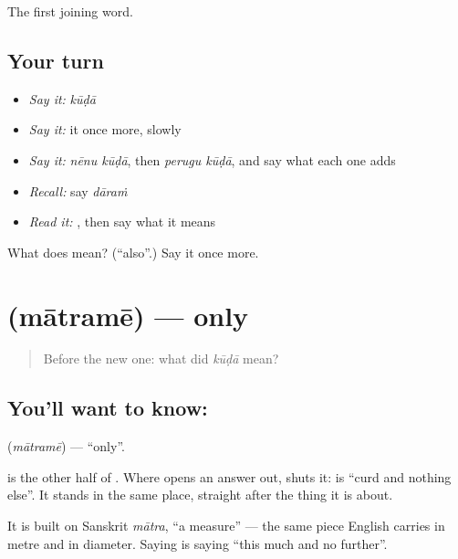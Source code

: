 \begin{grammarlens}[title={What you've built}]
The first joining word.
\end{grammarlens}

\subsection*{Your turn}
\begin{itemize}
\raggedright
  \item \emph{Say it:} \emph{kūḍā}
  \item \emph{Say it:} it once more, slowly
  \item \emph{Say it:} \emph{nēnu kūḍā}, then \emph{perugu kūḍā}, and say what each one adds
  \item \emph{Recall:} say \emph{dāraṁ}
  \item \emph{Read it:} \textbf{}, then say what it means
\end{itemize}

\begin{tcolorbox}[breakable,colback=teal!4,colframe=teal!35!black,title={Before you move on}]
What does  mean? (\textquotedblleft{}also\textquotedblright{}.) Say it once more.
\end{tcolorbox}
\section[\texorpdfstring{\te{మాత్రమే} (mātramē)}{మాత్రమే (mātramē)}]{ (mātramē) — only}

\label{lesson:TE-C64-only}



\begin{quote}
Before the new one: what did \emph{kūḍā} mean?
\end{quote}

\subsection*{You'll want to know: }
\textbf{} (\emph{mātramē}) — \textquotedblleft{}only\textquotedblright{}.

 is the other half of . Where  opens an answer out,  shuts it:   is \textquotedblleft{}curd and nothing else\textquotedblright{}. It stands in the same place, straight after the thing it is about.

It is built on Sanskrit \emph{mātra}, \textquotedblleft{}a measure\textquotedblright{} — the same piece English carries in metre and in diameter. Saying  is saying \textquotedblleft{}this much and no further\textquotedblright{}.

